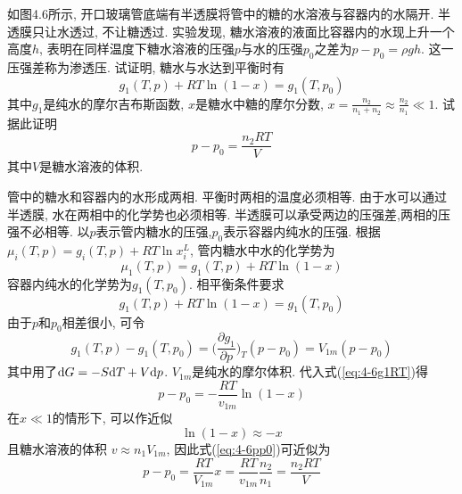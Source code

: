 \begin{problem}[4.6]
如图4.6所示, 开口玻璃管底端有半透膜将管中的糖的水溶液与容器内的水隔开. 半透膜只让水透过, 不让糖透过. 实验发现, 糖水溶液的液面比容器内的水现上升一个高度$h$, 表明在同样温度下糖水溶液的压强$p$与水的压强$p_0$之差为$p - p_0 = \rho g h$.
这一压强差称为渗透压. 试证明, 糖水与水达到平衡时有
\[
g_1(T,p)+RT\ln(1-x) = g_1(T,p_0)
\]
其中$g_1$是纯水的摩尔吉布斯函数, $x$是糖水中糖的摩尔分数, $x=\frac{n_2}{n_1+n_2}\approx \frac{n_2}{n_1}\ll 1$. 试据此证明
\[
p - p_0=\frac{n_2RT}{V}
\]
其中$V$是糖水溶液的体积.
\end{problem}
\begin{solution}
管中的糖水和容器内的水形成两相. 平衡时两相的温度必须相等. 由于水可以通过半透膜, 水在两相中的化学势也必须相等. 半透膜可以承受两边的压强差,两相的压强不必相等. 以$p$表示管内糖水的压强,$p_0$表示容器内纯水的压强. 根据$\mu_i(T,p)=g_i(T,p)+RT\ln x_i^L$, 管内糖水中水的化学势为
\[
\mu_1(T,p) = g_1(T,p) + RT\ln(1-x)
\]
容器内纯水的化学势为$g_1(T,p_0)$. 相平衡条件要求
\begin{equation}\label{eq:4-6g1RT}
g_1(T,p)+RT\ln(1-x) = g_1(T,p_0)
\end{equation}
由于$p$和$p_0$相差很小, 可令
\[
g_1(T,p)-g_1(T,p_0) = \bigg(\frac{\partial g_1}{\partial p}\bigg)_T(p-p_0) = V_{1m}(p-p_0)
\]
其中用了$\mathrm{d} G=-S\mathrm{d} T + V\mathrm{d} p$. $V_{1m}$是纯水的摩尔体积. 代入式(\ref{eq:4-6g1RT})得
\begin{equation}\label{eq:4-6pp0}
p - p_0 =-\frac{RT}{v_{1m}}\ln(1-x)
\end{equation}
在$x\ll 1$的情形下, 可以作近似
\[
\ln(1-x) \approx -x
\]
且糖水溶液的体积 $v\approx n_1V_{1m}$, 因此式(\ref{eq:4-6pp0})可近似为
\[
p - p_0 = \frac{RT}{V_{1m}} x = \frac{RT}{v_{1m}}\frac{n_2}{n_1} = \frac{n_2RT}{V}
\]
\end{solution}
